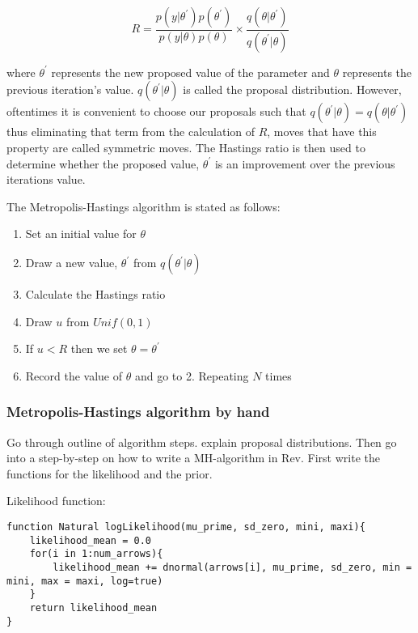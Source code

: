 \[ R = \frac{p( y | \theta^\prime  ) p(\theta^\prime) }{p( y | \theta ) p(\theta)}  \times \frac{ q( \theta | \theta^\prime )} { q( \theta^\prime | \theta) } \]

where $\theta^\prime$ represents the new proposed value of the parameter and $\theta$ represents the previous iteration's value. $q(\theta^\prime | \theta)$ is called the proposal distribution. However, oftentimes it is convenient to choose our proposals such that $ q(\theta^\prime | \theta) = q(\theta | \theta^\prime)$ thus eliminating that term from the calculation of $R$, moves that have this property are called symmetric moves. The Hastings ratio is then used to determine whether the proposed value, $\theta^\prime$ is an improvement over the previous iterations value. 

The Metropolis-Hastings algorithm is stated as follows:
\begin{enumerate}
\item Set an initial value for $\theta$
\item Draw a new value, $\theta^\prime$ from $q(\theta^\prime | \theta)$
\item Calculate the Hastings ratio
\item Draw $u$ from $Unif(0,1)$ 
\item If $u < R$ then we set $\theta = \theta^\prime$ 
\item Record the value of $\theta$ and go to 2. Repeating $N$ times
\end{enumerate}



\subsubsection{Metropolis-Hastings algorithm by hand}

Go through outline of algorithm steps. explain proposal distributions. Then go into a step-by-step on how to write a MH-algorithm in Rev. First write the functions for the likelihood and the prior. 

Likelihood function:

{\tt \begin{snugshade*}
\begin{lstlisting}
function Natural logLikelihood(mu_prime, sd_zero, mini, maxi){
	likelihood_mean = 0.0
	for(i in 1:num_arrows){
		likelihood_mean += dnormal(arrows[i], mu_prime, sd_zero, min = mini, max = maxi, log=true)
	}
	return likelihood_mean
}
\end{lstlisting}
\end{snugshade*}}

